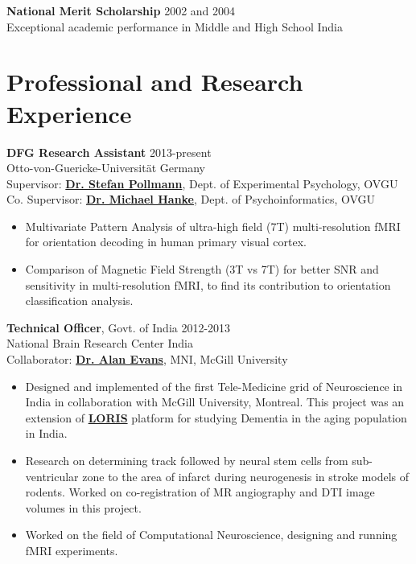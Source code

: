 \documentclass[line, margin]{res}
\begin{document}
\begin{resume}
\textbf{National Merit Scholarship} \hfill 2002 and 2004\\
Exceptional academic performance in Middle and High School \hfill India\\



\section{Professional and Research Experience}

\textbf{DFG Research Assistant} \hfill 2013-present\\
Otto-von-Guericke-Universit\"{a}t \hfill Germany\\
Supervisor: \href{http://www.ipsy.ovgu.de/ipsy/en/Departments/Experimental+Psychology/People.html}{\textbf{Dr. Stefan Pollmann}}, Dept. of Experimental Psychology, OVGU\\
Co. Supervisor: \href{http://mih.voxindeserto.de/}{\textbf{Dr. Michael Hanke}}, Dept. of Psychoinformatics, OVGU

\begin{itemize}
    \item Multivariate Pattern Analysis of ultra-high field (7T) multi-resolution fMRI for orientation decoding in human primary visual cortex. 
    \item Comparison of Magnetic Field Strength (3T vs 7T) for better SNR and sensitivity in multi-resolution fMRI, to find its contribution to orientation classification analysis.
\end{itemize}


\textbf{Technical Officer}, Govt. of India \hfill 2012-2013\\
National Brain Research Center \hfill India\\
Collaborator: \href{http://mcin-cnim.ca/people/alans-cv/}{\textbf{Dr. Alan Evans}}, MNI, McGill University 
\begin{itemize}

    \item Designed and implemented of the first Tele-Medicine grid of Neuroscience in India in collaboration with McGill University, Montreal. This project was an extension of \href{http://mcin-cnim.ca/neuroimagingtechnologies/loris/}{\textbf{LORIS}} platform for studying Dementia in the aging population in India. 
    \item Research on determining track followed by neural stem cells from sub-ventricular zone to the area of infarct during neurogenesis in stroke models of rodents. Worked on co-registration of MR angiography and DTI image volumes in this project.
    \item Worked on the field of Computational Neuroscience, designing and running fMRI experiments.
\end{itemize}




\end{resume}
\end{document}
